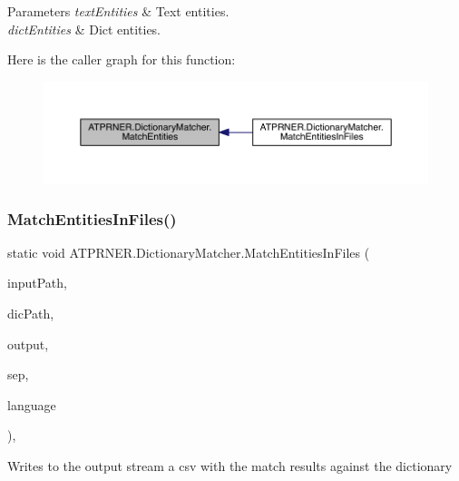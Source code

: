 \begin{DoxyParams}{Parameters}
{\em text\+Entities} & Text entities.\\
\hline
{\em dict\+Entities} & Dict entities.\\
\hline
\end{DoxyParams}
Here is the caller graph for this function\+:
\nopagebreak
\begin{figure}[H]
\begin{center}
\leavevmode
\includegraphics[width=350pt]{d0/d6a/class_a_t_p_r_n_e_r_1_1_dictionary_matcher_aa6fdeaf3a88c14b5ed8e4f452d1c3c17_icgraph}
\end{center}
\end{figure}
\hypertarget{class_a_t_p_r_n_e_r_1_1_dictionary_matcher_acb054c6ab6e27f9ea70e946671869d90}{}\label{class_a_t_p_r_n_e_r_1_1_dictionary_matcher_acb054c6ab6e27f9ea70e946671869d90} 
\subsubsection{\texorpdfstring{Match\+Entities\+In\+Files()}{MatchEntitiesInFiles()}}
{\footnotesize\ttfamily static void A\+T\+P\+R\+N\+E\+R.\+Dictionary\+Matcher.\+Match\+Entities\+In\+Files (\begin{DoxyParamCaption}\item[{string}]{input\+Path,  }\item[{string}]{dic\+Path,  }\item[{Text\+Writer}]{output,  }\item[{char}]{sep,  }\item[{string}]{language }\end{DoxyParamCaption})\hspace{0.3cm}{\ttfamily [inline]}, {\ttfamily [static]}}



Writes to the output stream a csv with the match results against the dictionary 


